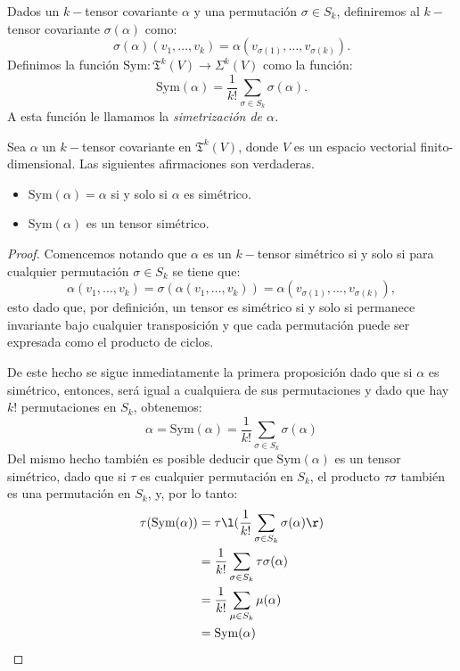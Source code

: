 \begin{definition}
	Dados un $k-$tensor covariante $\alpha$ y una permutación $\sigma \in S_{k}$,
	definiremos al $k-$tensor covariante $\sigma(\alpha)$ como:
	\[
		\sigma(\alpha)(v_1,\ldots,v_k) = \alpha(v_{\sigma(1)},\ldots,v_{\sigma(k)}).
	\]
	Definimos la función $\mathrm{Sym}: \mathfrak{T}^k(V) \to \Sigma^{k}(V)$ como
	la función:
	\[
		\mathrm{Sym}(\alpha) = \frac{1}{k!} \sum_{\sigma \in S_{k}} \sigma(\alpha).
	\]
	A esta función le llamamos la \it{simetrización} de $\alpha$.
\end{definition}

\begin{lemma}
	Sea $\alpha$ un $k-$tensor covariante en $\mathfrak{T}^{k}(V)$, donde $V$ es un
	espacio vectorial finito-dimensional. Las siguientes afirmaciones son
	verdaderas.
	\begin{itemize}
		\item $\mathrm{Sym}(\alpha) = \alpha$ si y solo si $\alpha$ es simétrico.
		\item $\mathrm{Sym}(\alpha)$ es un tensor simétrico.
	\end{itemize}
\end{lemma}

\begin{proof}
	Comencemos notando que $\alpha$ es un $k-$tensor simétrico si y solo si
	para cualquier permutación $\sigma \in S_{k}$ se tiene que:
	\[
		\alpha(v_1, \ldots, v_k) = \sigma (\alpha(v_1, \ldots, v_k)) =
		\alpha(v_{\sigma(1)}, \ldots, v_{\sigma(k)}),
	\]
	esto dado que, por definición, un tensor es simétrico si y solo si permanece
	invariante bajo cualquier transposición y que cada permutación puede ser
	expresada como el producto de ciclos.

	De este hecho se sigue inmediatamente la primera proposición dado
	que si $\alpha$ es simétrico, entonces, será igual a cualquiera de sus
	permutaciones y dado que hay $k!$	permutaciones en $S_k$, obtenemos:
	\[
		\alpha = \mathrm{Sym}(\alpha) = \frac{1}{k!} \sum_{\sigma \in
			S_{k}} \sigma(\alpha)
	\]
	Del mismo hecho también es posible deducir que $\mathrm{Sym}(\alpha)$ es un
	tensor simétrico, dado que si $\tau$ es cualquier permutación en
	$S_{k}$, el producto $\tau \sigma$ también es una permutación en
	$S_k$, y, por lo tanto:
	\begin{align*}
		\tau(\mathrm{Sym}(\alpha))
		 & = \tau \l( \frac{1}{k!} \sum_{\sigma\in S_k} \sigma(\alpha) \r) \\
		 & = \frac{1}{k!} \sum_{\sigma \in S_k} \tau\sigma(\alpha)         \\
		 & = \frac{1}{k!} \sum_{\mu \in S_k} \mu(\alpha)                   \\
		 & = \mathrm{Sym}(\alpha)
	\end{align*}
\end{proof}

